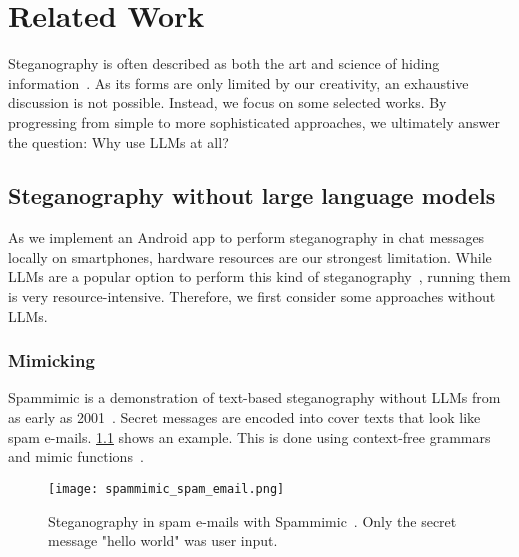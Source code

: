 
\chapter{Related Work}\label{ch:relatedwork}
\glsresetall %

Steganography is often described as both the art and science of hiding information~\cite{bennettLinguisticSteganographySurvey2004}. As its forms are only limited by our creativity, an exhaustive discussion is not possible. Instead, we focus on some selected works. By progressing from simple to more sophisticated approaches, we ultimately answer the question: Why use \glspl{LLM} at all?

\section{Steganography without large language models}
\label{sec:steganographyWithoutLLMs}
As we implement an Android app to perform steganography in chat messages locally on smartphones, hardware resources are our strongest limitation. While \glspl{LLM} are a popular option to perform this kind of steganography~\cite{zieglerNeuralLinguisticSteganography2019}, running them is very resource-intensive. Therefore, we first consider some approaches without \glspl{LLM}.

\subsection{Mimicking}
\label{sec:mimicking}
Spammimic is a demonstration of text-based steganography without \glspl{LLM} from as early as 2001~\cite{spammimicSpammimic2000}. Secret messages are encoded into cover texts that look like spam e-mails. \cref{fig:spammimicSpamEmail} shows an example. This is done using context-free grammars and mimic functions~\cite{waynerMimicFunctions1992,bennettLinguisticSteganographySurvey2004}.

\begin{figure}
	\centering
	\captionsetup{width=\linewidth}
	\texttt{[image: spammimic\_spam\_email.png]}
	\caption[Spammimic]{Steganography in spam e-mails with Spammimic~\cite{spammimicSpammimic2000}. Only the secret message "hello world" was user input.}
	\label{fig:spammimicSpamEmail}
\end{figure}


